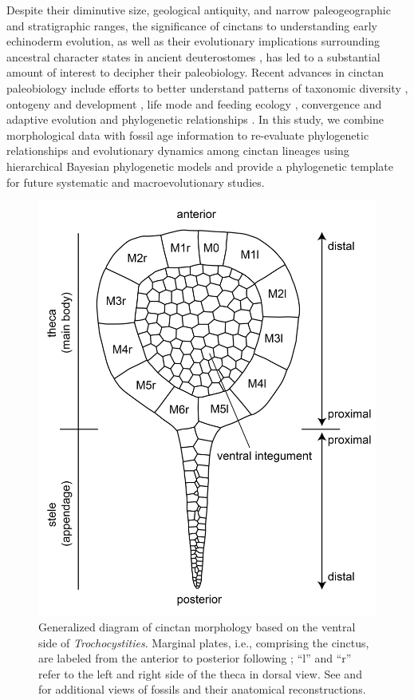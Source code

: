 \documentclass{article}
\begin{document}
Despite their diminutive size, geological antiquity, and narrow paleogeographic and stratigraphic ranges, the significance of cinctans to understanding early echinoderm evolution, as well as their evolutionary implications surrounding ancestral character states in ancient deuterostomes \citep{SmithSwalla2009}, has led to a substantial amount of interest to decipher their paleobiology. Recent advances in cinctan paleobiology include efforts to better understand patterns of taxonomic diversity \citep{ZamoraAlvaro2010}, ontogeny and development \citep{Smith2005,ZamoraRahmanSmith2013}, life mode and feeding ecology \citep{Rahman2009b, RahmanEtAl2015,ZamoraRahman2015}, convergence and adaptive evolution \citep{ZamoraSmith2008} and phylogenetic relationships \citep{Freidrich1993, Sdzuy1993, SmithZamora2009, ZamoraRahmanSmith2013}. In this study, we combine morphological data with fossil age information to re-evaluate phylogenetic relationships and evolutionary dynamics among cinctan lineages using hierarchical Bayesian phylogenetic models and provide a phylogenetic template for future systematic and macroevolutionary studies.
\begin{figure}
  \includegraphics[width=\textwidth]{figures/Cinctan_diagram-01.jpg}
  \caption{Generalized diagram of cinctan morphology based on the ventral side of \textit{Trochocystities}. Marginal plates, i.e., comprising the cinctus, are labeled from the anterior to posterior following \cite{Freidrich1993}; “l” and “r” refer to the left and right side of the theca in dorsal view. See \cite{SmithZamora2009} and \cite{Rahman2016} for additional views of fossils and their anatomical reconstructions.}
\end{figure}
\end{document}
